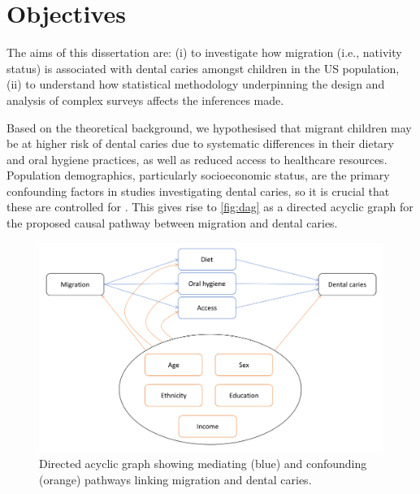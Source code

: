\section{Objectives}

The aims of this dissertation are: (i) to investigate how migration (i.e., nativity status) is associated with dental caries amongst children in the US population, (ii) to understand how statistical methodology underpinning the design and analysis of complex surveys affects the inferences made.

Based on the theoretical background, we hypothesised that migrant children may be at higher risk of dental caries due to systematic differences in their dietary and oral hygiene practices, as well as reduced access to healthcare resources. Population demographics, particularly socioeconomic status, are the primary confounding factors in studies investigating dental caries, so it is crucial that these are controlled for \citep{bashir2021, bashir2022}. This gives rise to \autoref{fig:dag} as a directed acyclic graph for the proposed causal pathway between migration and dental caries.

\begin{figure}[ht]
\includegraphics[scale = 0.5]{images/dag}
\caption{Directed acyclic graph showing mediating (blue) and confounding (orange) pathways linking migration and dental caries.}
\label{fig:dag}
\end{figure}